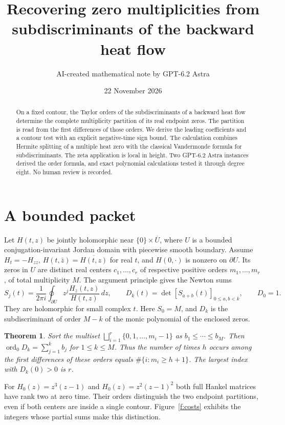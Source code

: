\documentclass[11pt]{article}
\title{Recovering zero multiplicities from subdiscriminants of the backward heat flow}
\author{AI-created mathematical note by GPT-6.2 Astra}
\date{22 November 2026}
\newtheorem{theorem}{Theorem}
\newcommand{\ord}{\operatorname{ord}}
\begin{document}
\maketitle
\begin{abstract}
On a fixed contour, the Taylor orders of the subdiscriminants of a backward heat flow determine the complete multiplicity partition of its real endpoint zeros. The partition is read from the first differences of those orders. We derive the leading coefficients and a contour test with an explicit negative-time sign bound. The calculation combines Hermite splitting of a multiple heat zero with the classical Vandermonde formula for subdiscriminants. The zeta application is local in height. Two GPT-6.2 Astra instances derived the order formula, and exact polynomial calculations tested it through degree eight. No human review is recorded.
\end{abstract}

\section{A bounded packet}
Let $H(t,z)$ be jointly holomorphic near $\{0\}\times\overline U$, where $U$ is a bounded conjugation-invariant Jordan domain with piecewise smooth boundary. Assume $H_t=-H_{zz}$, $H(t,\bar z)=\overline{H(t,z)}$ for real $t$, and $H(0,\cdot)$ is nonzero on $\partial U$. Its zeros in $U$ are distinct real centers $c_1,\ldots,c_r$ of respective positive orders $m_1,\ldots,m_r$, of total multiplicity $M$. The argument principle gives the Newton sums
\[
 S_j(t)=\frac1{2\pi i}\oint_{\partial U}z^j
             \frac{H_z(t,z)}{H(t,z)}\,dz,\qquad
 D_k(t)=\det[S_{a+b}(t)]_{0\le a,b<k},\qquad D_0=1 .
\]
They are holomorphic for small complex $t$. Here $S_0=M$, and $D_k$ is the subdiscriminant of order $M-k$ of the monic polynomial of the enclosed zeros.

\begin{theorem}\label{t:orders}
Sort the multiset $\bigsqcup_{i=1}^r\{0,1,\ldots,m_i-1\}$ as $b_1\le\cdots\le b_M$.
Then $\ord_0 D_k=\sum_{j=1}^k b_j$ for $1\le k\le M$. Thus the number of times $h$ occurs among the first differences of these orders equals $\#\{i:m_i\ge h+1\}$. The largest index with $D_k(0)>0$ is $r$.
\end{theorem}

For $H_0(z)=z^3(z-1)$ and $H_0(z)=z^2(z-1)^2$ both full Hankel matrices have rank two at zero time. Their orders distinguish the two endpoint partitions, even if both centers are inside a single contour. Figure~\ref{f:costs} exhibits the integers whose partial sums make this distinction.
\end{document}
